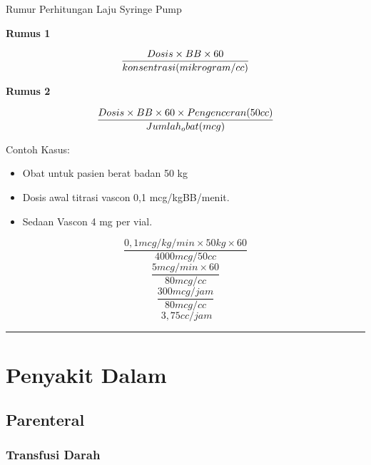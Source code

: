 \documentclass[
]{book}
\providecommand{\tightlist}{%
  \setlength{\itemsep}{0pt}\setlength{\parskip}{0pt}}
\begin{document}
Rumur Perhitungan Laju Syringe Pump

\textbf{Rumus 1}

\begin{equation}
\\
\frac{Dosis \times BB \times 60}{konsentrasi (mikrogram/cc)}
\\
\end{equation}

\textbf{Rumus 2}

\begin{equation}
\\
\frac{Dosis \times BB \times 60 \times Pengenceran(50 cc)}{Jumlah_obat (mcg)}
\end{equation}

Contoh Kasus:

\begin{itemize}
\tightlist
\item
  Obat untuk pasien berat badan 50 kg
\item
  Dosis awal titrasi vascon 0,1 mcg/kgBB/menit.
\item
  Sedaan Vascon 4 mg per vial.
\end{itemize}

\begin{equation}
\frac{0,1 mcg/kg/min \times 50 kg \times 60}{4000 mcg/50cc}
\end{equation}
\begin{equation}
\frac{5 mcg/min \times 60}{80mcg/cc}
\end{equation}
\begin{equation}
\frac{300 mcg/jam}{80 mcg/cc}
\end{equation}
\begin{equation}
\ 3,75 cc/jam
\end{equation}

\begin{center}\rule{0.5\linewidth}{0.5pt}\end{center}

\hypertarget{penyakit-dalam-2}{%
\section{Penyakit Dalam}\label{penyakit-dalam-2}}

\hypertarget{parenteral}{%
\subsection{Parenteral}\label{parenteral}}

\hypertarget{transfusi-darah}{%
\subsubsection{Transfusi Darah}\label{transfusi-darah}}
\end{document}
